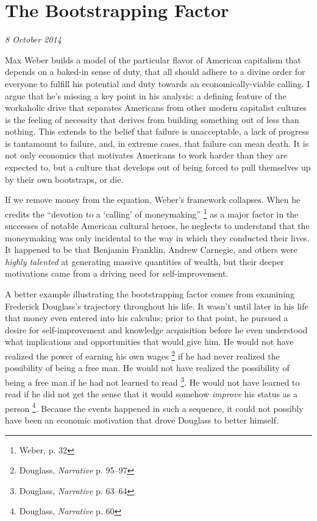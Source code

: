 \section{The Bootstrapping Factor}
\textit{8 October 2014}

Max Weber builds a model of the particular flavor of American
capitalism that depends on a baked-in sense of duty, that all should
adhere to a divine order for everyone to fulfill his potential and duty
towards an economically-viable calling. I argue that he's missing a key
point in his analysis: a defining feature of the workaholic drive that separates
Americans from other modern capitalist cultures is the feeling of necessity that
derives from building something out of less than nothing. This extends to the
belief that failure is unacceptable, a lack of progress is tantamount to
failure, and, in extreme cases, that failure can mean death. It is not only
economics that motivates Americans to work harder than they are expected to, but
a culture that develops out of being forced to pull themselves up by their own
bootstraps, or die.

If we remove money from the equation, Weber's framework collapses. When
he credits the ``devotion to a `calling' of moneymaking''
\footnote{Weber, p. 32} as a major factor in the successes of notable
American cultural heroes, he neglects to understand that the
moneymaking was only incidental to the way in which they conducted
their lives. It happened to be that Benjamin Franklin, Andrew Carnegie,
and others were \textit{highly talented} at generating massive
quantities of wealth, but their deeper motivations came from a driving
need for self-improvement.

A better example illustrating the bootstrapping factor comes from
examining Frederick Douglass's trajectory throughout his life. It
wasn't until later in his life that money even entered into his
calculus; prior to that point, he pursued a desire for self-improvement
and knowledge acquisition before he even understood what implications
and opportunities that would give him. He would not have realized the
power of earning his own wages \footnote{Douglass, \textit{Narrative}
p. 95--97} if he had never realized the possibility of being a free
man. He would not have realized the possibility of being a free man if
he had not learned to read \footnote{Douglass, \textit{Narrative} p.
63--64}. He would not have learned to read if he did not get the sense
that it would somehow \textit{improve} his status as a person
\footnote{Douglass, \textit{Narrative} p. 60}. Because the events
happened in such a sequence, it could not possibly have been an
economic motivation that drove Douglass to better himself.


